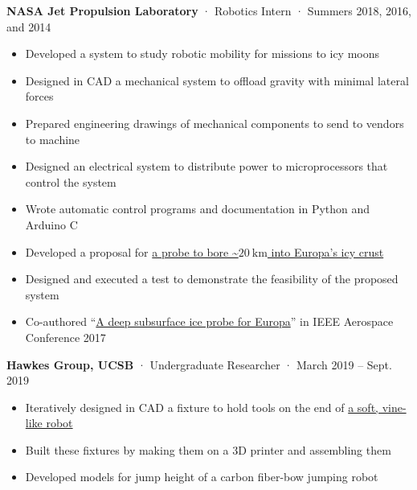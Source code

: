 \documentclass[12pt, oneside]{article}
\newcommand{\jobtitle}[3] {
	{\bf #1} · {#2} · {#3} \vspace{-7pt} \\
}
\begin{document}
\begin{flushleft}
\jobtitle{NASA Jet Propulsion Laboratory}{Robotics Intern}{Summers 2018, 2016, and 2014}
\begin{itemize}
	\item Developed a system to study robotic mobility for missions to icy moons \\
	\item Designed in CAD a mechanical system to offload gravity with minimal lateral forces \\
	\item Prepared engineering drawings of mechanical components to send to vendors to machine \\
	\item Designed an electrical system to distribute power to microprocessors that control the system \\
	\item Wrote automatic control programs and documentation in Python and Arduino C \\
	\item Developed a proposal for \href{https://portfolium.com/entry/owms-deep-subsurface-access-level-wind}{a probe to bore \textasciitilde$\SI{20}{\kilo\meter}$ into Europa's icy crust} \\
	\item Designed and executed a test to demonstrate the feasibility of the proposed system \\
	\item Co-authored ``\href{https://ieeexplore-ieee-org.proxy.library.ucsb.edu:9443/stamp/stamp.jsp?tp=&arnumber=7943863}{A deep subsurface ice probe for Europa}'' in IEEE Aerospace Conference 2017 \\
\end{itemize}

\jobtitle{Hawkes Group, UCSB}{Undergraduate Researcher}{March 2019 – Sept. 2019}
\begin{itemize}
	\item Iteratively designed in CAD a fixture to hold tools on the end of \href{https://portfolium.com/entry/vine-robot-tool-mount}{a soft, vine-like robot} \\
	\item Built these fixtures by making them on a 3D printer and assembling them \\
	\item Developed models for jump height of a carbon fiber-bow jumping robot
\end{itemize}


\end{flushleft}
\end{document}
